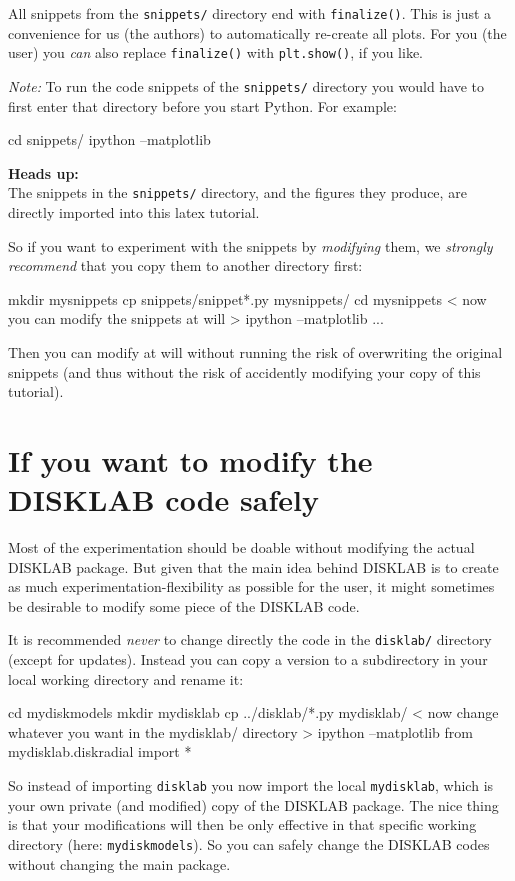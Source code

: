 \documentclass{book}
\newcommand{\code}[1]{{\small\tt #1}}
\begin{document}
All snippets from the \code{snippets/} directory end with
\code{finalize()}. This is just a convenience for us (the authors) to
automatically re-create all plots.  For you (the user) you {\em can} also
replace \code{finalize()} with \code{plt.show()}, if you like.

{\em Note:} To run the code snippets of the \code{snippets/} directory you would
have to first enter that directory before you start Python. For example:
\begin{codebox}[bash]
cd snippets/
ipython --matplotlib
\end{codebox}

{\bf Heads up:}\\
The snippets in the \code{snippets/} directory, and the figures they produce,
are directly imported into this latex tutorial.

So if you want to experiment with the snippets by {\em modifying} them, we
{\em strongly recommend} that you copy them to another directory first:
\begin{codebox}[bash]
mkdir mysnippets
cp snippets/snippet*.py mysnippets/
cd mysnippets
< now you can modify the snippets at will >
ipython --matplotlib
...
\end{codebox}
Then you can modify at will without running the risk of overwriting the
original snippets (and thus without the risk of accidently modifying your
copy of this tutorial).




\section{If you want to modify the {\sf DISKLAB} code safely}\label{sec-modif-safely}
Most of the experimentation should be doable without modifying the actual
{\sf DISKLAB} package. But given that the main idea behind {\sf DISKLAB} is
to create as much experimentation-flexibility as possible for the user, it
might sometimes be desirable to modify some piece of the {\sf DISKLAB} code.

It is recommended {\em never} to change directly the code in the \code{disklab/}
directory (except for updates). Instead you can copy a version to a subdirectory
in your local working directory and rename it:
\begin{codebox}
cd mydiskmodels
mkdir mydisklab
cp ../disklab/*.py mydisklab/
< now change whatever you want in the mydisklab/ directory >
ipython --matplotlib
from mydisklab.diskradial import *
\end{codebox}
So instead of importing \code{disklab} you now import the local
\code{mydisklab}, which is your own private (and modified) copy of the {\sf DISKLAB}
package. The nice thing is that your modifications will then be only effective
in that specific working directory (here: \code{mydiskmodels}). So you can safely
change the {\sf DISKLAB} codes without changing the main package.
\end{document}
